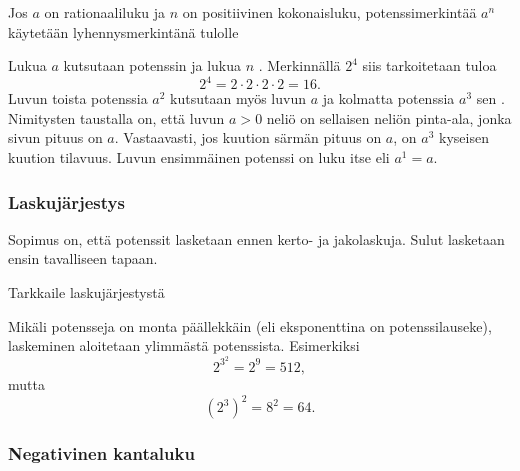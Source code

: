 Jos $a$ on rationaaliluku ja $n$ on positiivinen kokonaisluku, potenssimerkintää $a^n$ käytetään lyhennysmerkintänä tulolle
   
\laatikko{    \[
        a^n = \underbrace{a\cdot \ldots \cdot a}_{n\text{ kpl}}. 
    \]}
    
Lukua $a$ kutsutaan potenssin  ja lukua $n$ . Merkinnällä $2^4$ siis tarkoitetaan tuloa 
        \[
            2^4=2\cdot 2\cdot 2\cdot 2=16.
        \]
Luvun toista potenssia $a^2$ kutsutaan myös luvun $a$  ja kolmatta potenssia $a^3$ sen . Nimitysten taustalla on,
että luvun $a>0$ neliö on sellaisen neliön pinta-ala, jonka sivun pituus on $a$. Vastaavasti, jos kuution särmän pituus on $a$, on $a^3$ kyseisen kuution tilavuus.
Luvun ensimmäinen potenssi on luku itse eli $a^1 = a$.

\subsubsection*{Laskujärjestys}

Sopimus on, että potenssit lasketaan ennen kerto- ja jakolaskuja. Sulut lasketaan ensin tavalliseen tapaan.

    \begin{esimerkki}
      Tarkkaile laskujärjestystä
        \begin{alakohdat}
        \end{alakohdat}
    \end{esimerkki}  

Mikäli potensseja on monta päällekkäin (eli eksponenttina on potenssilauseke),
laskeminen aloitetaan ylimmästä potenssista. Esimerkiksi
\[2^{3^2}= 2^9 = 512, \]
mutta
\[(2^3)^2=8^2=64. \]

   
%  

\subsubsection*{Negativinen kantaluku}

